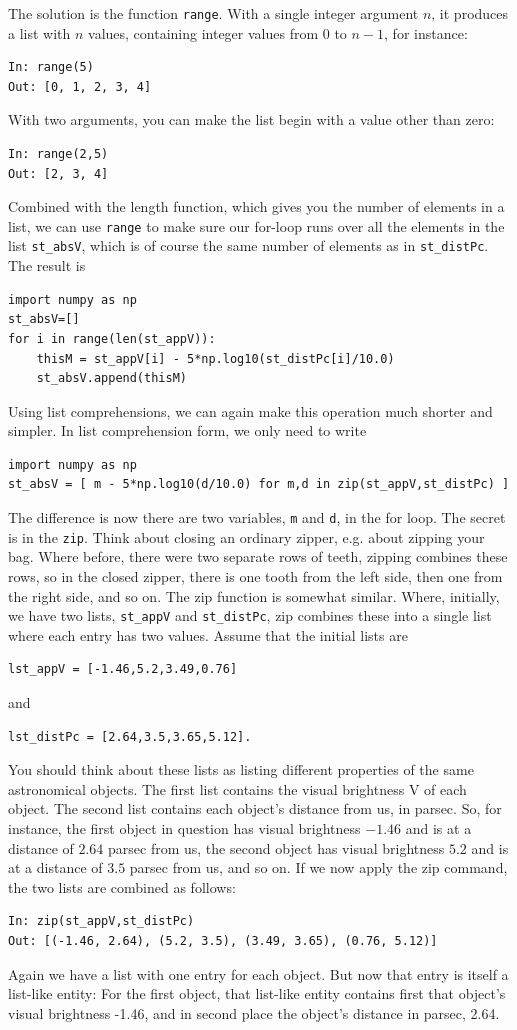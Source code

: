 \documentclass[twocolumn,apj]{openjournal}
\begin{document}
The solution is the function \verb|range|. With a single integer argument $n$, it produces a list with $n$ values, containing integer values from 0 to $n-1$, for instance:
\begin{lstlisting}
In: range(5)
Out: [0, 1, 2, 3, 4]
\end{lstlisting}
With two arguments, you can make the list begin with a value other than zero:
\begin{lstlisting}
In: range(2,5)
Out: [2, 3, 4]
\end{lstlisting}
Combined with the length function, which gives you the number of elements in a list, we can use \verb|range| to make sure our for-loop runs over all the elements in the list \verb|st_absV|, which is of course the same number of elements as in \verb|st_distPc|. The result is
\begin{lstlisting}
import numpy as np
st_absV=[]
for i in range(len(st_appV)):
	thisM = st_appV[i] - 5*np.log10(st_distPc[i]/10.0)
	st_absV.append(thisM)
\end{lstlisting}
Using list comprehensions, we can again make this operation much shorter and simpler. In list comprehension form, we only need to write
\begin{lstlisting}
import numpy as np
st_absV = [ m - 5*np.log10(d/10.0) for m,d in zip(st_appV,st_distPc) ]
\end{lstlisting}
The difference is now there are two variables, \verb|m| and \verb|d|, in the for loop. The secret is in the \verb|zip|. Think about closing an ordinary zipper, e.g. about zipping your bag. Where before, there were two separate rows of teeth, zipping combines these rows, so in the closed zipper, there is one tooth from the left side, then one from the right side, and so on. The zip function is somewhat similar. Where, initially, we have two lists, 
\verb|st_appV| and \verb|st_distPc|, zip combines these into a single list where each entry has two values. Assume that the initial lists are
\begin{lstlisting}
lst_appV = [-1.46,5.2,3.49,0.76]
\end{lstlisting}
and
\begin{lstlisting}
lst_distPc = [2.64,3.5,3.65,5.12].
\end{lstlisting}
You should think about these lists as listing different properties of the same astronomical objects. The first list contains the visual brightness V of each object. The second list contains each object's distance from us, in parsec. So, for instance, the first object in question has visual brightness $-1.46$ and is at a distance of $2.64$ parsec from us, the second object has visual brightness $5.2$ and is at a distance of $3.5$ parsec from us, and so on. If we now apply the zip command, the two lists are combined as follows:
\begin{lstlisting}
In: zip(st_appV,st_distPc)
Out: [(-1.46, 2.64), (5.2, 3.5), (3.49, 3.65), (0.76, 5.12)]
\end{lstlisting}
Again we have a list with one entry for each object. But now that entry is itself a list-like entity: For the first object, that list-like entity contains first that object's visual brightness -1.46, and in second place the object's distance in parsec, 2.64.
\end{document}
